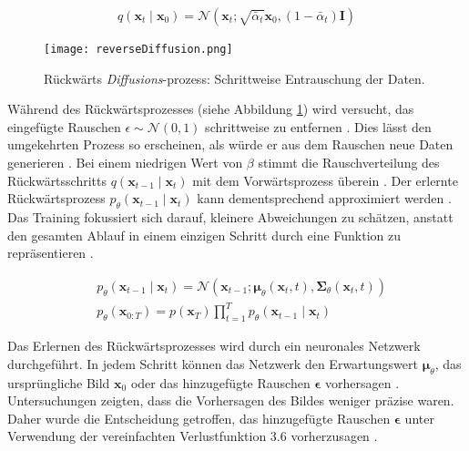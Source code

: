 \documentclass[
  a4paper,  %
  twoside,  %
  bibliography=totoc,
  headsepline,
  cleardoublepage=empty,
  parskip=half,
  draft=false
]{scrbook}
\begin{document}
\begin{equation}
    q\left(\mathbf{x}_t \mid \mathbf{x}_0\right)=\mathcal{N}\left(\mathbf{x}_t ; \sqrt{\bar{\alpha}_t} \mathbf{x}_0,\left(1-\bar{\alpha}_t\right) \mathbf{I}\right)
\end{equation}

\begin{figure}[h]
  \centering
  \texttt{[image: reverseDiffusion.png]}
  \caption[Rückwertsprozess Diffusion]{Rückwärts \emph{Diffusions}-prozess: Schrittweise Entrauschung der Daten. \cite{machine_learning_at_berkeley_diffusion_2022}}
  \label{fig:reverseDiffusion}
\end{figure} 

Während des Rückwärtsprozesses (siehe Abbildung \ref{fig:reverseDiffusion}) wird versucht, das eingefügte Rauschen $\epsilon \sim \mathcal{N}(0,1)$ schrittweise zu entfernen \cite{machine_learning_at_berkeley_diffusion_2022}. Dies lässt den umgekehrten Prozess so erscheinen, als würde er aus dem Rauschen neue Daten generieren \cite{machine_learning_at_berkeley_diffusion_2022}. Bei einem niedrigen Wert von $\beta$ stimmt die Rauschverteilung des Rückwärtsschritts \( q\left(\mathbf{x}_{t-1} \mid \mathbf{x}_t\right) \) mit dem Vorwärtsprozess überein \cite{sohl-dickstein_deep_2015}. Der erlernte Rückwärtsprozess \( p_\theta\left(\mathbf{x}_{t-1} \mid \mathbf{x}_t\right) \) kann dementsprechend approximiert werden \cite{ho_denoising_2020, machine_learning_at_berkeley_diffusion_2022, nichol_improved_2021}. Das Training fokussiert sich darauf, kleinere Abweichungen zu schätzen, anstatt den gesamten Ablauf in einem einzigen Schritt durch eine Funktion zu repräsentieren \cite{sohl-dickstein_deep_2015}.


\begin{align}
& p_\theta\left(\mathbf{x}_{t-1} \mid \mathbf{x}_t\right)=\mathcal{N}\left(\mathbf{x}_{t-1} ; \boldsymbol{\mu}_\theta\left(\mathbf{x}_t, t\right), \boldsymbol{\Sigma}_\theta\left(\mathbf{x}_t, t\right)\right)\\
& p_\theta\left(\mathbf{x}_{0: T}\right)=p\left(\mathbf{x}_T\right) \prod_{t=1}^T p_\theta\left(\mathbf{x}_{t-1} \mid \mathbf{x}_t\right)
\end{align}

Das Erlernen des Rückwärtsprozesses wird durch ein neuronales Netzwerk durchgeführt. In jedem Schritt können das Netzwerk den Erwartungswert $\boldsymbol{\mu}_\theta$, das ursprüngliche Bild $\boldsymbol{x}_0$ oder das hinzugefügte Rauschen $\boldsymbol{\epsilon}$ vorhersagen \cite{ho_denoising_2020, nichol_improved_2021}. Untersuchungen zeigten, dass die Vorhersagen des Bildes weniger präzise waren. Daher wurde die Entscheidung getroffen, das hinzugefügte Rauschen $\boldsymbol{\epsilon}$ unter Verwendung der vereinfachten Verlustfunktion 3.6 vorherzusagen \cite{ho_denoising_2020}.
\end{document}
